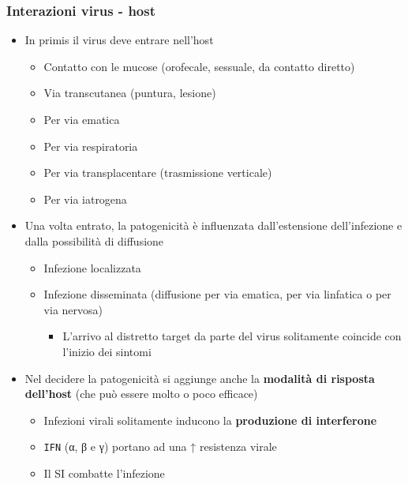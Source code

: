 \documentclass[italian,]{article}
\providecommand{\tightlist}{%
  \setlength{\itemsep}{0pt}\setlength{\parskip}{0pt}}
\begin{document}
\hypertarget{interazioni-virus---host}{%
\subsubsection{Interazioni virus -
host}\label{interazioni-virus---host}}

\begin{itemize}
\tightlist
\item
  In primis il virus deve entrare nell'host

  \begin{itemize}
  \tightlist
  \item
    Contatto con le mucose (orofecale, sessuale, da contatto diretto)
  \item
    Via transcutanea (puntura, lesione)
  \item
    Per via ematica
  \item
    Per via respiratoria
  \item
    Per via transplacentare (trasmissione verticale)
  \item
    Per via iatrogena
  \end{itemize}
\item
  Una volta entrato, la patogenicità è influenzata dall'estensione
  dell'infezione e dalla possibilità di diffusione

  \begin{itemize}
  \tightlist
  \item
    Infezione localizzata
  \item
    Infezione disseminata (diffusione per via ematica, per via linfatica
    o per via nervosa)

    \begin{itemize}
    \tightlist
    \item
      L'arrivo al distretto target da parte del virus solitamente
      coincide con l'inizio dei sintomi
    \end{itemize}
  \end{itemize}
\item
  Nel decidere la patogenicità si aggiunge anche la \textbf{modalità di
  risposta dell'host} (che può essere molto o poco efficace)

  \begin{itemize}
  \tightlist
  \item
    Infezioni virali solitamente inducono la \textbf{produzione di
    interferone}
  \item
    \texttt{IFN} (α, β e γ) portano ad una ↑ resistenza virale
  \item
    Il SI combatte l'infezione


\end{itemize}
\end{itemize}
\end{document}
